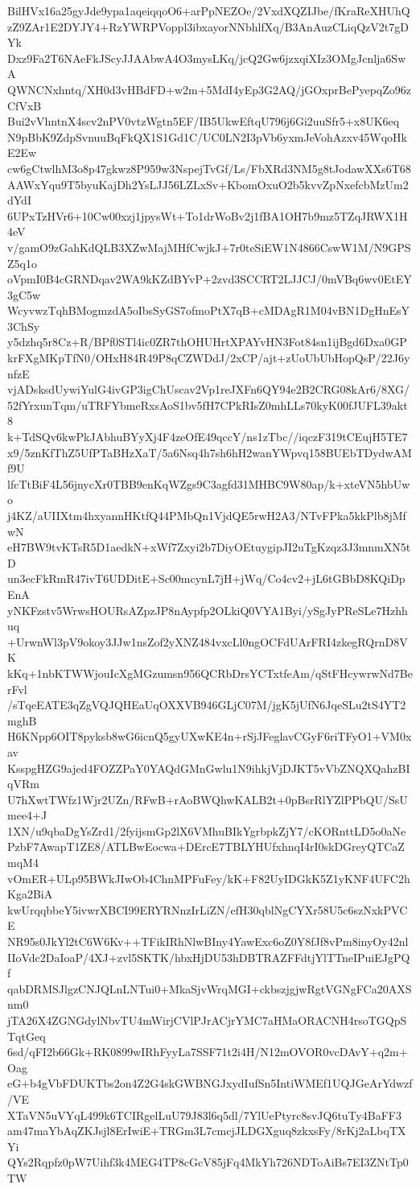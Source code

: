 BilHVx16a25gyJde9ypa1aqeiqqoO6+arPpNEZOe/2VxdXQZIJbe/fKraReXHUhQ
zZ9ZAr1E2DYJY4+RzYWRPVoppl3ibxayorNNbhlfXq/B3AnAuzCLiqQzV2t7gDYk
Dxz9Fa2T6NAeFkJScyJJAAbwA4O3mysLKq/jcQ2Gw6jzxqiXIz3OMgJcnlja6SwA
QWNCNxhntq/XH0d3vHBdFD+w2m+5MdI4yEp3G2AQ/jGOxprBePyepqZo96zCfVxB
Bui2vVhntnX4scv2nPV0vtzWgtn5EF/IB5UkwEftqU796j6Gi2uuSfr5+x8UK6eq
N9pBbK9ZdpSvnuuBqFkQX1S1Gd1C/UC0LN2I3pVb6yxmJeVohAzxv45WqoHkE2Ew
cw6gCtwlhM3o8p47gkwz8P959w3NspejTvGf/Ls/FbXRd3NM5g8tJodawXXs6T68
AAWxYqu9T5byuKajDh2YsLJJ56LZLxSv+KbomOxuO2b5kvvZpNxefcbMzUm2dYdI
6UPxTzHVr6+10Cw00xzj1jpysWt+To1drWoBv2j1fBA1OH7b9mz5TZqJRWX1H4eV
v/gamO9zGahKdQLB3XZwMajMHfCwjkJ+7r0teSiEW1N4866CswW1M/N9GPSZ5q1o
oVpmI0B4cGRNDqav2WA9kKZdBYvP+2zvd3SCCRT2LJJCJ/0mVBq6wv0EtEY3gC5w
WcyvwzTqhBMogmzdA5oIbsSyGS7ofmoPtX7qB+cMDAgR1M04vBN1DgHnEsY3ChSy
y5dzhq5r8Cz+R/BPf0STl4ic0ZR7thOHUHrtXPAYvHN3Fot84sn1ijBgd6Dxa0GP
krFXgMKpTfN0/OHxH84R49P8qCZWDdJ/2xCP/ajt+zUoUbUbHopQsP/22J6ynfzE
vjADsksdUywiYulG4ivGP3igChUscav2Vp1reJXFn6QY94e2B2CRG08kAr6/8XG/
52fYrxunTqm/uTRFYbmeRxsAoS1bv5fH7CPkRIsZ0mhLLs70kyK00fJUFL39akt8
k+TdSQv6kwPkJAbhuBYyXj4F4zeOfE49qccY/ns1zTbc//iqczF319tCEujH5TE7
x9/5znKfThZ5UfPTaBHzXaT/5a6Nsq4h7sh6hH2wanYWpvq158BUEbTDydwAMf9U
lfcTtBiF4L56jnycXr0TBB9enKqWZgs9C3agfd31MHBC9W80ap/k+xteVN5hbUwo
j4KZ/aUIIXtm4hxyannHKtfQ44PMbQn1VjdQE5rwH2A3/NTvFPka5kkPlb8jMfwN
eH7BW9tvKTsR5D1aedkN+xWf7Zxyi2b7DiyOEtuygipJI2uTgKzqz3J3mnmXN5tD
un3ecFkRmR47ivT6UDDitE+Sc00mcynL7jH+jWq/Co4cv2+jL6tGBbD8KQiDpEnA
yNKFzstv5WrwsHOURsAZpzJP8nAypfp2OLkiQ0VYA1Byi/ySgJyPReSLe7Hzhhuq
+UrwnWl3pV9okoy3JJw1nsZof2yXNZ484vxcLl0ngOCFdUArFRI4zkegRQrnD8VK
kKq+1nbKTWWjouIcXgMGzumsn956QCRbDrsYCTxtfeAm/qStFHcywrwNd7BerFvl
/sTqeEATE3qZgVQJQHEaUqOXXVB946GLjC07M/jgK5jUfN6JqeSLu2tS4YT2mghB
H6KNpp6OIT8pyksb8wG6icnQ5gyUXwKE4n+rSjJFeglavCGyF6riTFyO1+VM0xav
KsspgHZG9ajed4FOZZPaY0YAQdGMnGwlu1N9ihkjVjDJKT5vVbZNQXQahzBIqVRm
U7hXwtTWfz1Wjr2UZn/RFwB+rAoBWQhwKALB2t+0pBsrRlYZlPPbQU/SsUmee4+J
1XN/u9qbaDgYsZrd1/2fyijsmGp2lX6VMhuBIkYgrbpkZjY7/cKORnttLD5o0aNe
PzbF7AwapT1ZE8/ATLBwEocwa+DErcE7TBLYHUfxhnqI4rI0skDGreyQTCaZmqM4
vOmER+ULp95BWkJIwOb4ChnMPFuFey/kK+F82UyIDGkK5Z1yKNF4UFC2hKga2BiA
kwUrqqbbeY5ivwrXBCI99ERYRNnzIrLiZN/efH30qblNgCYXr58U5c6szNxkPVCE
NR95s0JkYl2tC6W6Kv++TFikIRhNlwBIny4YawExc6oZ0Y8fJf8vPm8inyOy42nl
IIoVdc2DaIoaP/4XJ+zvl5SKTK/hbxHjDU53hDBTRAZFFdtjYlTTneIPuiEJgPQf
qabDRMSJlgzCNJQLnLNTui0+MkaSjvWrqMGI+ckbszjgjwRgtVGNgFCa20AXSnm0
jTA26X4ZGNGdylNbvTU4mWirjCVlPJrACjrYMC7aHMaORACNH4rsoTGQpSTqtGeq
6sd/qFI2b66Gk+RK0899wIRhFyyLa7SSF71t2i4H/N12mOVOR0vcDAvY+q2m+Oag
eG+b4gVbFDUKTbs2on4Z2G4skGWBNGJxydIufSn5IntiWMEf1UQJGeArYdwzf/VE
XTaVN5uVYqL499k6TCIRgelLuU79J83l6q5dl/7YlUePtyrc8svJQ6tuTy4BaFF3
am47maYbAqZKJsjl8ErIwiE+TRGm3L7cmcjJLDGXguq8zkxsFy/8rKj2aLbqTXYi
QYs2Rqpfz0pW7Uihf3k4MEG4TP8cGcV85jFq4MkYh726NDToAiBs7EI3ZNtTp0TW
